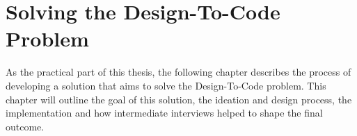 \newpage
\section{Solving the Design-To-Code Problem}
As the practical part of this thesis, the following chapter describes the process of developing a
solution that aims to solve the Design-To-Code problem. This chapter will outline the goal of this
solution, the ideation and design process, the implementation and how intermediate interviews helped
to shape the final outcome. 







